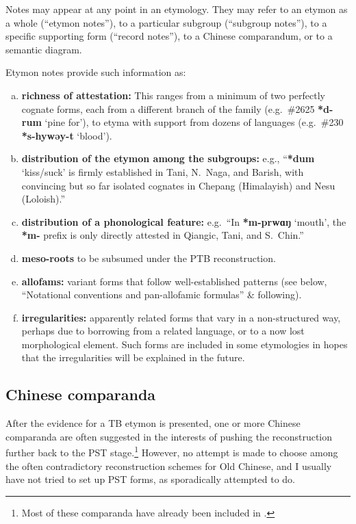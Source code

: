 Notes may appear at any point in an etymology. They may refer to an etymon as a whole (“etymon notes”), to a particular subgroup (“subgroup notes”), to a specific supporting form (“record notes”), to a Chinese comparandum, or to a semantic diagram.

Etymon notes provide such information as:

\begin{enumerate}[(a)]
\item \textbf{richness of attestation:}
This ranges from a minimum of two perfectly cognate forms, each from a different branch of the family (e.g.\ \#2625 \textbf{*d-rum} ‘pine for’), to etyma with support from dozens of languages (e.g.\ \#230 \textbf{*s-hywǝy-t} ‘blood’).
\item \textbf{distribution of the etymon among the subgroups:}
e.g., “\textbf{*dum} ‘kiss/suck’ is firmly established in Tani, N.\ Naga, and Barish, with convincing but so far isolated cognates in Chepang (Himalayish) and Nesu (Loloish).”
\item \textbf{distribution of a phonological feature:}
e.g.\ “In \textbf{*m-prwɑŋ} ‘mouth’, the \textbf{*m-} prefix is only directly attested in Qiangic, Tani, and S.\ Chin.”
\item \textbf{meso-roots} to be subsumed under the PTB reconstruction.
\item \textbf{allofams:}
variant forms that follow well-established patterns (see below, “Notational conventions and pan-allofamic formulas” \& following).
\item \textbf{irregularities:}
apparently related forms that vary in a non-structured way, perhaps due to borrowing from a related language, or to a now lost morphological element. Such forms are included in some etymologies in hopes that the irregularities will be explained in the future.
\end{enumerate}

\subsection{Chinese comparanda}

After the evidence for a TB etymon is presented, one or more Chinese comparanda are often suggested in the interests of pushing the reconstruction further back to the PST stage.\footnote{Most of these comparanda have already been included in \textit{}.} However, no attempt is made to choose among the often contradictory reconstruction schemes for Old Chinese, and I usually have not tried to set up PST forms, as \textit{} sporadically attempted to do.

